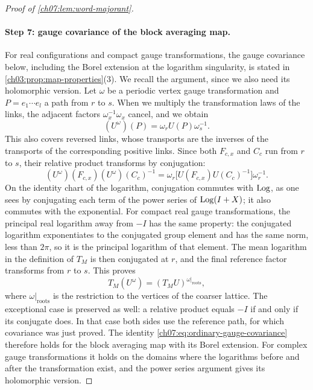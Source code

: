 \begin{proof}[Proof of \cref{ch07:lem:word-majorant}]
\paragraph{Step 7: gauge covariance of the block averaging map.}
For real configurations and compact gauge transformations, the gauge covariance below, including the Borel extension at the logarithm singularity, is stated in \cref{ch03:prop:map-properties}(3). We recall the argument, since we also need its holomorphic version. Let $\omega$ be a periodic vertex gauge transformation and $P=e_1\cdots e_l$ a path from $r$ to $s$. When we multiply the transformation laws of the links, the adjacent factors $\omega_x^{-1}\omega_x$ cancel, and we obtain
\[
 (U^\omega)(P)=\omega_rU(P)\omega_s^{-1}.
\]
This also covers reversed links, whose transports are the inverses of the transports of the corresponding positive links. Since both $F_{c,x}$ and $C_c$ run from $r$ to $s$, their relative product transforms by conjugation:
\[
 (U^\omega)(F_{c,x})(U^\omega)(C_c)^{-1}=\omega_r\bigl[U(F_{c,x})U(C_c)^{-1}\bigr]\omega_r^{-1}.
\]
On the identity chart of the logarithm, conjugation commutes with $\operatorname{Log}$, as one sees by conjugating each term of the power series of $\operatorname{Log}(I+X)$; it also commutes with the exponential. For compact real gauge transformations, the principal real logarithm away from $-I$ has the same property: the conjugated logarithm exponentiates to the conjugated group element and has the same norm, less than $2\pi$, so it is the principal logarithm of that element. The mean logarithm in the definition of $T_M$ is then conjugated at $r$, and the final reference factor transforms from $r$ to $s$. This proves
\begin{equation}\label{ch07:eq:ordinary-gauge-covariance}
 T_M(U^\omega)=(T_MU)^{\omega|_{\mathrm{roots}}},
\end{equation}
where $\omega|_{\mathrm{roots}}$ is the restriction to the vertices of the coarser lattice. The exceptional case is preserved as well: a relative product equals $-I$ if and only if its conjugate does. In that case both sides use the reference path, for which covariance was just proved. The identity \eqref{ch07:eq:ordinary-gauge-covariance} therefore holds for the block averaging map with its Borel extension. For complex gauge transformations it holds on the domains where the logarithms before and after the transformation exist, and the power series argument gives its holomorphic version.


\end{proof}
